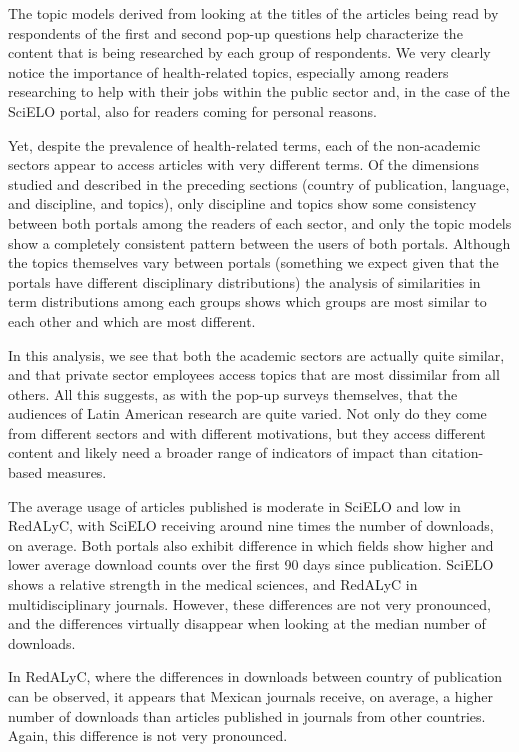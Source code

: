 The topic models derived from looking at the titles of the articles being read by respondents of the first and second pop-up questions help characterize the content that is being researched by each group of respondents. We very clearly notice the importance of health-related topics, especially among readers researching to help with their jobs within the public sector and, in the case of the SciELO portal, also for readers coming for personal reasons.

Yet, despite the prevalence of health-related terms, each of the non-academic sectors appear to access articles with very different terms. Of the dimensions studied and described in the preceding sections (country of publication, language, and discipline, and topics), only discipline and topics show some consistency between both portals among the readers of each sector, and only the topic models show a completely consistent pattern between the users of both portals. Although the topics themselves vary between portals (something we expect given that the portals have different disciplinary distributions) the analysis of similarities in term distributions among each groups shows which groups are most similar to each other and which are most different.

In this analysis, we see that both the academic sectors are actually quite similar, and that private sector employees access topics that are most dissimilar from all others. All this suggests, as with the pop-up surveys themselves, that the audiences of Latin American research are quite varied. Not only do they come from different sectors and with different motivations, but they access different content and likely need a broader range of indicators of impact than citation-based measures.

The average usage of articles published is moderate in SciELO and low in RedALyC, with SciELO receiving around nine times the number of downloads, on average. Both portals also exhibit difference in which fields show higher and lower average download counts over the first 90 days since publication. SciELO shows a relative strength in the medical sciences, and RedALyC in multidisciplinary journals. However, these differences are not very pronounced, and the differences virtually disappear when looking at the median number of downloads.

In RedALyC, where the differences in downloads between country of publication can be observed, it appears that Mexican journals receive, on average, a higher number of downloads than articles published in journals from other countries. Again, this difference is not very pronounced.

